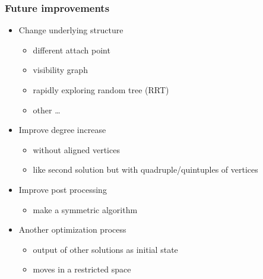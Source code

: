 
\begin{frame}
  \frametitle{Future improvements}
  \begin{itemize}
  \item Change underlying \alert{structure}\pause
    \begin{itemize}
    \item different \alert{attach point}\pause
    \item visibility graph\pause
    \item rapidly exploring random tree (RRT)\pause
    \item other \dots\pause
    \end{itemize}
  \item Improve \alert{degree} increase\pause
    \begin{itemize}
    \item without \alert{aligned} vertices\pause
    \item like second solution but with quadruple/quintuples
      of vertices\pause
    \end{itemize}
  \item Improve \alert{post processing}\pause
    \begin{itemize}
    \item make a \alert{symmetric} algorithm\pause
    \end{itemize}
  \item Another \alert{optimization} process\pause
    \begin{itemize}
    \item output of other solutions as initial state\pause
    \item moves in a restricted space
    \end{itemize}
  \end{itemize}
\end{frame}


